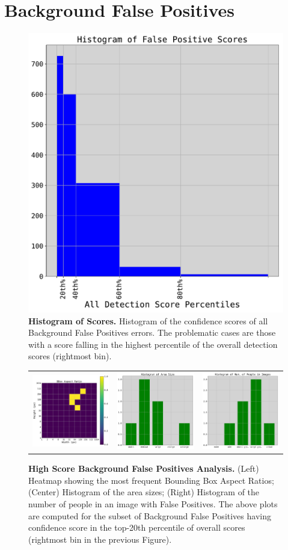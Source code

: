 \documentclass[10pt,onecolumn,letterpaper]{article}
\begin{document}
\section{Background False Positives}

\begin{figure}[h!]
\centering
\includegraphics[width=.25\linewidth]{./result/rmpe/background_errors/false_positives/bckd_false_pos_scores_histogram.pdf}
\vspace{-3mm}
\caption{ {\small \textbf{Histogram of Scores.} Histogram of the confidence scores of all Background False Positives
errors. The problematic cases are those with a score falling in the highest percentile of the overall detection scores (rightmost bin).}}
\end{figure}

\begin{figure}[h!]
\centering
\begin{tabular}{ccc}
\includegraphics[width=.2\linewidth]{./result/rmpe/background_errors/false_positives/bckd_false_pos_bbox_aspect_ratio_3.pdf} &
\includegraphics[width=.2\linewidth]{./result/rmpe/background_errors/false_positives/bckd_false_pos_area_histogram.pdf} &
\includegraphics[width=.2\linewidth]{./result/rmpe/background_errors/false_positives/bckd_false_pos_num_people_histogram.pdf}\\
\end{tabular}
\vspace{-2mm}
\caption{ {\small \textbf{High Score Background False Positives Analysis.} (Left) Heatmap showing the most frequent Bounding Box Aspect Ratios;
(Center) Histogram of the area sizes; (Right) Histogram of the number of people in an image with False Positives.
The above plots are computed for the subset of Background False Positives having confidence score in the top-20th percentile of overall scores
(rightmost bin in the previous Figure).}}
\end{figure}
\end{document}
